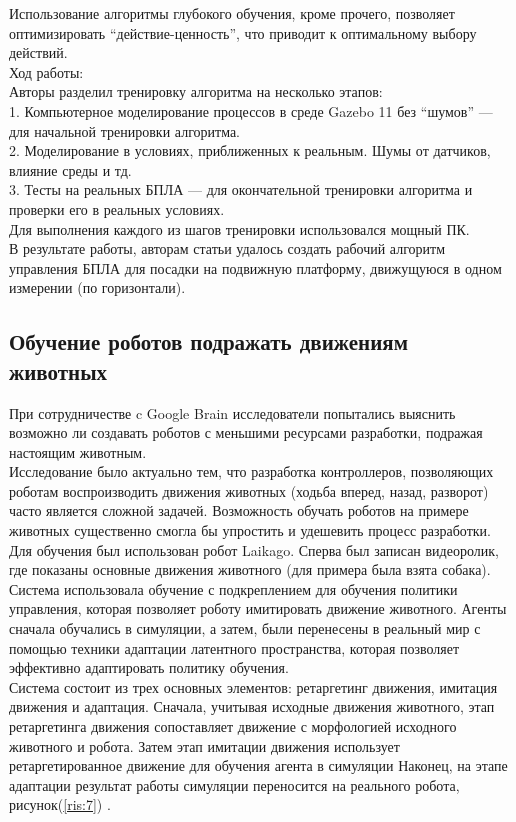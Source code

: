 \documentclass[12 pt, a4paper]{article}
\theoremstyle{definition}
\theoremstyle{plain}
\theoremstyle{remark}
\begin{document}
Использование алгоритмы глубокого обучения, кроме прочего, позволяет оптимизировать “действие-ценность”, что приводит к оптимальному выбору действий. \\

Ход работы: \\
Авторы разделил тренировку алгоритма на несколько этапов:\\
1.	Компьютерное моделирование процессов в среде Gazebo 11 без “шумов” — для начальной тренировки алгоритма. \\
2.	Моделирование в условиях, приближенных к реальным. Шумы от датчиков, влияние среды и тд. \\
3.	Тесты на реальных БПЛА — для окончательной тренировки алгоритма и проверки его в реальных условиях. \\

Для выполнения каждого из шагов тренировки использовался мощный ПК. \\
В результате работы, авторам статьи удалось создать рабочий алгоритм управления БПЛА для посадки на подвижную платформу, движущуюся в одном измерении (по горизонтали). \\

\subsection{Обучение роботов подражать движениям животных \cite{litlink4}}
При сотрудничестве c Google Brain исследователи попытались выяснить возможно ли создавать роботов с меньшими ресурсами разработки, подражая настоящим животным.\\

Исследование было актуально тем, что разработка контроллеров, позволяющих роботам воспроизводить движения животных (ходьба вперед, назад, разворот) часто является сложной задачей. Возможность обучать роботов на примере животных существенно смогла бы упростить и удешевить процесс разработки.\\
Для обучения был использован робот Laikago. Сперва был записан видеоролик, где показаны основные движения животного (для примера была взята собака). Система использовала обучение с подкреплением для обучения политики управления, которая позволяет роботу имитировать движение животного. Агенты сначала обучались в симуляции, а затем, были перенесены в реальный мир с помощью техники адаптации латентного пространства, которая позволяет эффективно адаптировать политику обучения. \\
Система состоит из трех основных элементов: ретаргетинг движения, имитация движения и адаптация.
Сначала, учитывая исходные движения животного, этап ретаргетинга движения сопоставляет движение с морфологией исходного животного и робота.
Затем этап имитации движения использует ретаргетированное движение для обучения агента в симуляции
Наконец, на этапе адаптации результат работы симуляции переносится на реального робота, рисунок(\ref{ris:7}) .\\
\end{document}
